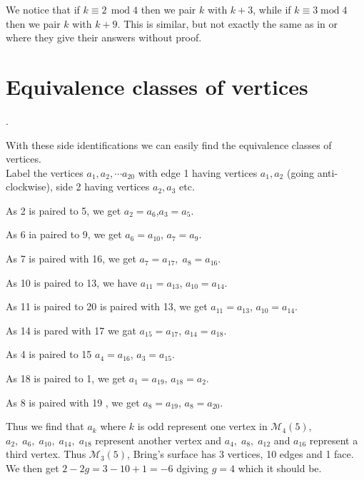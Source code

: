 \documentclass{amsproc}
\numberwithin{equation}{section}
\numberwithin{equation}{section}
\theoremstyle{definition}
\theoremstyle{remark}
\numberwithin{equation}{section}
\begin{document}
We notice that if $k\equiv 2\,
\; \text{mod}\; 4$ then we pair $k$ with $k+3$, while if $k\equiv  3\; \text{mod}\; 4$ then we pair $k$ with $k+9$.  This is similar, but not exactly the same as in \cite{RR92} or \cite{BN12} where they give their answers without  proof.

\newpage

\section{Equivalence  classes  of vertices}.
  
  With these side identifications we can easily find the equivalence classes of vertices. \\Label the vertices $a_1, a_2,\cdots a_{20}$ with edge 1 having vertices  $a_1, a_2$ (going anti-clockwise), side 2 having vertices $a_2, a_3$ etc.
  

As 2 is paired to 5, we get $a_2=a_6$,\;$a_3=a_5$.
  
   
As 6 ia paired to 9, we get $a_6=a_{10}$,  $a_7=a_9.$


As 7 is paired with 16, we get $a_7=a_{17},\; a_8=a_{16}$.

As 10 is paired to 13, we have $a_{11}=a_{13}$, $a_{10}=a_{14}.$

As 11 is paired to 20 is paired with 13, we get $a_{11}= a_{13}$, $a_{10}=a_{14}.$

As 14 is pared with 17 we gat $a_{15}=a_{17}$, $a_{14}=a_{18}.$

As 4 is paired to 15 $a_4=a_{16}$, $a_3=a_{15}.$

As 18 is paired to 1, we get $a_1=a_{19}$, $a_{18}=a_2.$

As 8 is paired with 19 , we get $a_8=a_{19}$, $a_8=a_{20}.$ 


Thus we find that $a_k$ where $k$ is odd represent one vertex in $\mathscr{M}_4(5)$,   $a_2,\; a_6,\;a_{10},\;a_{14},\;a_{18}$ represent another vertex and $a_4,\;a_8,\;a_{12}$ and $a_{16}$ represent a third vertex. Thus $\mathscr{M}_3(5)$, Bring's surface has 3 vertices, 10 edges and 1 face.  We then get $2-2g=3-10+1= -6$ dgiving $g=4$ which it should be.

\end{document}
